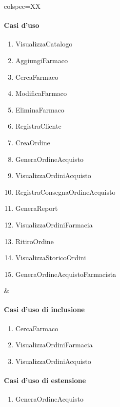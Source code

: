 \begin{table}[h]
	\centering
	\begin{tblr}{colspec=XX}
		\begin{minipage}[t]{\linewidth}
			\paragraph{Casi d'uso}
			\begin{enumerate}
				\item VisualizzaCatalogo %
				\item AggiungiFarmaco %
				\item CercaFarmaco %
				\item ModificaFarmaco %
				\item EliminaFarmaco %
				\item RegistraCliente %
				\item CreaOrdine %
				\item GeneraOrdineAcquisto %
				\item VisualizzaOrdiniAcquisto %
				\item RegistraConsegnaOrdineAcquisto %
				\item GeneraReport %
				\item VisualizzaOrdiniFarmacia %
				\item RitiroOrdine %
				\item VisualizzaStoricoOrdini %
				\item GeneraOrdineAcquistoFarmacista %
			\end{enumerate}
		\end{minipage} &
		\begin{minipage}[t]{\linewidth}
			\paragraph{Casi d'uso di inclusione}
			\begin{enumerate}
				\item CercaFarmaco
				\item VisualizzaOrdiniFarmacia
				\item VisualizzaOrdiniAcquisto
			\end{enumerate}

			\paragraph{Casi d'uso di estensione}
			\begin{enumerate}
				\item GeneraOrdineAcquisto %
			\end{enumerate}
		\end{minipage}
	\end{tblr}
\end{table}

